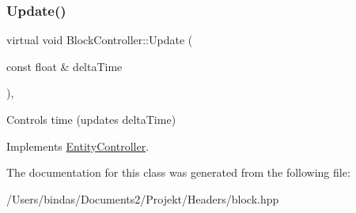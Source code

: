 \subsubsection{\texorpdfstring{Update()}{Update()}}
{\footnotesize\ttfamily virtual void Block\+Controller\+::\+Update (\begin{DoxyParamCaption}\item[{const float \&}]{delta\+Time }\end{DoxyParamCaption})\hspace{0.3cm}{\ttfamily [override]}, {\ttfamily [virtual]}}

Controls time (updates delta\+Time) 

Implements \mbox{\hyperlink{class_entity_controller_ab7f285a1c788ab04b9f0c0260dc8c523}{Entity\+Controller}}.



The documentation for this class was generated from the following file\+:\begin{DoxyCompactItemize}
\item 
/\+Users/bindas/\+Documents2/\+Projekt/\+Headers/block.\+hpp\end{DoxyCompactItemize}

